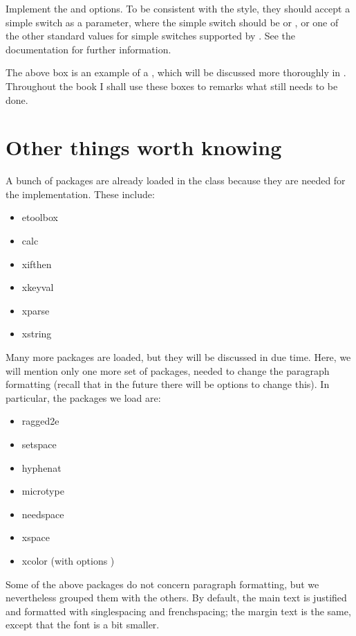 \begin{kaobox}[frametitle=To Do]
Implement the  and  options. To be 
consistent with the \KOMAScript\xspace style, they should accept a 
simple switch as a parameter, where the simple switch should be 
 or , or one of the other standard values for 
simple switches supported by \KOMAScript. See the \KOMAScript\xspace 
documentation for further information.
\end{kaobox}

The above box is an example of a , which will be 
discussed more thoroughly in . Throughout the book I 
shall use these boxes to remarks what still needs to be done.

\section{Other things worth knowing}

A bunch of packages are already loaded in the class because they are 
needed for the implementation. These include:

\begin{itemize}
	\item etoolbox
	\item calc
	\item xifthen
	\item xkeyval
	\item xparse
	\item xstring
\end{itemize}

Many more packages are loaded, but they will be discussed in due time. 
Here, we will mention only one more set of packages, needed to change 
the paragraph formatting (recall that in the future there will be 
options to change this). In particular, the packages we load are:

\begin{itemize}
	\item ragged2e
	\item setspace
	\item hyphenat
	\item microtype
	\item needspace
	\item xspace
	\item xcolor (with options )
\end{itemize}

Some of the above packages do not concern paragraph formatting, but we 
nevertheless grouped them with the others. By default, the main text is 
justified and formatted with singlespacing and frenchspacing; the margin 
text is the same, except that the font is a bit smaller.

